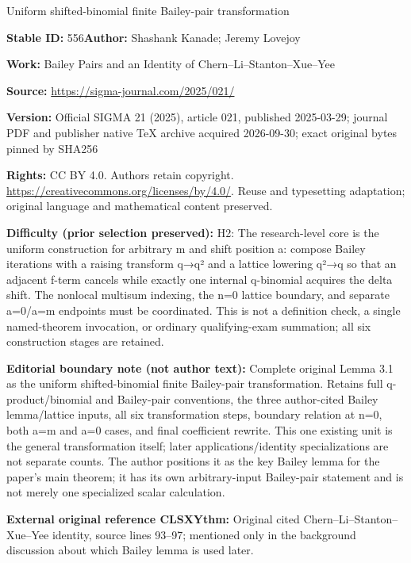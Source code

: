 \documentclass[11pt]{article}
\numberwithin{equation}{section}
\numberwithin{equation}{section}
\begin{document}
\begin{center}\Large Uniform shifted-binomial finite Bailey-pair transformation\end{center}
\noindent\textbf{Stable ID:} 556\quad\textbf{Author:} Shashank Kanade; Jeremy Lovejoy\par
\noindent\textbf{Work:} Bailey Pairs and an Identity of Chern–Li–Stanton–Xue–Yee\par
\noindent\textbf{Source:} \url{https://sigma-journal.com/2025/021/}\par
\noindent\textbf{Version:} Official SIGMA 21 (2025), article 021, published 2025-03-29; journal PDF and publisher native TeX archive acquired 2026-09-30; exact original bytes pinned by SHA256\par
\noindent\textbf{Rights:} CC BY 4.0. Authors retain copyright. \url{https://creativecommons.org/licenses/by/4.0/}. Reuse and typesetting adaptation; original language and mathematical content preserved.\par
\noindent\textbf{Difficulty (prior selection preserved):} {\CJKfont H2: The research-level core is the uniform construction for arbitrary m and shift position a: compose Bailey iterations with a raising transform q→q² and a lattice lowering q²→q so that an adjacent f-term cancels while exactly one internal q-binomial acquires the delta shift. The nonlocal multisum indexing, the n=0 lattice boundary, and separate a=0/a=m endpoints must be coordinated. This is not a definition check, a single named-theorem invocation, or ordinary qualifying-exam summation; all six construction stages are retained.}\par
\medskip\noindent\textbf{Editorial boundary note (not author text):} Complete original Lemma 3.1 as the uniform shifted-binomial finite Bailey-pair transformation. Retains full q-product/binomial and Bailey-pair conventions, the three author-cited Bailey lemma/lattice inputs, all six transformation steps, boundary relation at n=0, both a=m and a=0 cases, and final coefficient rewrite. This one existing unit is the general transformation itself; later applications/identity specializations are not separate counts. The author positions it as the key Bailey lemma for the paper’s main theorem; it has its own arbitrary-input Bailey-pair statement and is not merely one specialized scalar calculation.\par
\noindent\textbf{External original reference CLSXYthm:} Original cited Chern–Li–Stanton–Xue–Yee identity, source lines 93–97; mentioned only in the background discussion about which Bailey lemma is used later.\par
\end{document}
